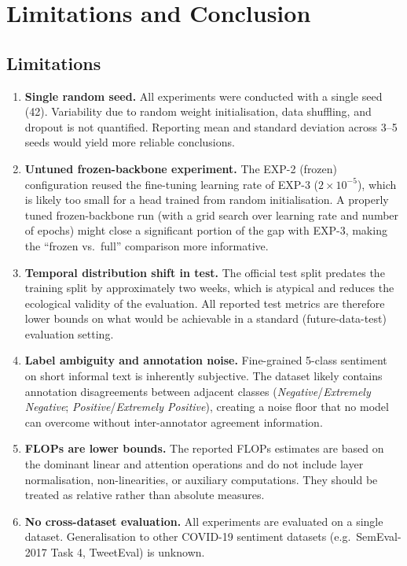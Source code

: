 \section{Limitations and Conclusion}

\subsection{Limitations}

\begin{enumerate}
    \item \textbf{Single random seed.} All experiments were conducted with a single seed (42). Variability due to random weight initialisation, data shuffling, and dropout is not quantified. Reporting mean and standard deviation across 3--5 seeds would yield more reliable conclusions.

    \item \textbf{Untuned frozen-backbone experiment.} The EXP-2 (frozen) configuration reused the fine-tuning learning rate of EXP-3 ($2\times10^{-5}$), which is likely too small for a head trained from random initialisation. A properly tuned frozen-backbone run (with a grid search over learning rate and number of epochs) might close a significant portion of the gap with EXP-3, making the ``frozen vs.\ full'' comparison more informative.

    \item \textbf{Temporal distribution shift in test.} The official test split predates the training split by approximately two weeks, which is atypical and reduces the ecological validity of the evaluation. All reported test metrics are therefore lower bounds on what would be achievable in a standard (future-data-test) evaluation setting.

    \item \textbf{Label ambiguity and annotation noise.} Fine-grained 5-class sentiment on short informal text is inherently subjective. The dataset likely contains annotation disagreements between adjacent classes (\textit{Negative}/\textit{Extremely Negative}; \textit{Positive}/\textit{Extremely Positive}), creating a noise floor that no model can overcome without inter-annotator agreement information.

    \item \textbf{FLOPs are lower bounds.} The reported FLOPs estimates are based on the dominant linear and attention operations and do not include layer normalisation, non-linearities, or auxiliary computations. They should be treated as relative rather than absolute measures.

    \item \textbf{No cross-dataset evaluation.} All experiments are evaluated on a single dataset. Generalisation to other COVID-19 sentiment datasets (e.g.\ SemEval-2017 Task 4, TweetEval) is unknown.
\end{enumerate}

